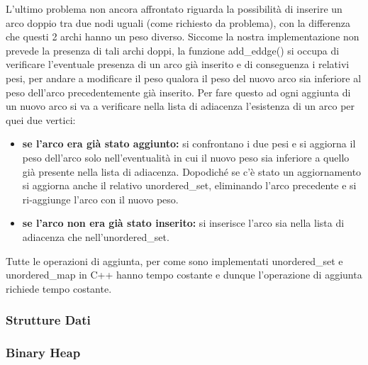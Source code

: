 L'ultimo problema non ancora affrontato riguarda la possibilità di inserire un arco doppio tra due nodi uguali (come richiesto da problema), con la differenza che questi 2 archi hanno un peso diverso. Siccome la nostra implementazione non prevede la presenza di tali archi doppi, la funzione add\_eddge() si occupa di verificare l'eventuale presenza di un arco già inserito e di conseguenza i relativi pesi, per andare a modificare il peso qualora il peso del nuovo arco sia inferiore al peso dell'arco precedentemente già inserito. Per fare questo ad ogni aggiunta di un nuovo arco si va a verificare nella lista di adiacenza l'esistenza di un arco per quei due vertici:
\begin{itemize}
	\item \textbf{se l'arco era già stato aggiunto:} si confrontano i due pesi e si aggiorna il peso dell'arco solo nell'eventualità in cui il nuovo peso sia inferiore a quello già presente nella lista di adiacenza. Dopodiché se c'è stato un aggiornamento si aggiorna anche il relativo unordered\_set, eliminando l'arco precedente e si ri-aggiunge l'arco con il nuovo peso. 
	\item \textbf{se l'arco non era già stato inserito:} si inserisce l'arco sia nella lista di adiacenza che nell'unordered\_set.
\end{itemize}

Tutte le operazioni di aggiunta, per come sono implementati unordered\_set e unordered\_map in C++ hanno tempo costante e dunque l'operazione di aggiunta richiede tempo costante.


\subsubsection{Strutture Dati}

\subsubsection{Binary Heap}

